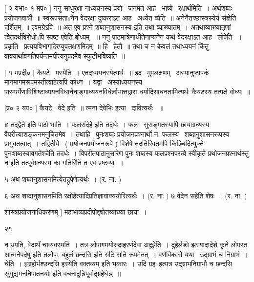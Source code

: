 \documentclass[11pt, openany]{book}
\begin{document}
 [ २ यभा० १ मप० ] ननु साधुरक्षा नाध्ययनस्य प्रयो \textendash\ जनमत
आह \textendash\ भाष्ये \textendash\ रक्षार्थमिति~। अर्थशब्दः प्रयोजनवाची~॥ स्वरूपसताsनेन
वेदरक्षा दुष्कराऽत आह \textendash\ अध्येत व्येति~॥ अनेनैतच्छास्त्रस्येयं संज्ञेति
दर्शितम्~॥ एवमग्रेऽपि~॥ अत एव प्रश्ने {\qt शब्दानुशासनस्य} इति तथा
व्याख्यातम्~। अतथाव्याख्यातृणां त्वेतदर्थविरोधोsपि स्पष्ट एवेति बोध्यम्
~॥ ननु पाठमात्रेणाधीतेनाप्यनेन कथं वेदरक्षाऽत आह \textendash\ लोपेति ~॥प्रकृति \textendash\ 
प्रत्ययविभागादेरप्युपलक्षणमिदम्~॥ हि \textendash\ हेतौ~॥ तथा च न केवलं तथाध्ययनं
किंतु वाक्यार्थावगतिपर्यन्तमपीत्यनुपदमेव स्फुटीभविष्यति~॥ 

 [ १ मप्रदी० ] कैयटे \textendash\ मस्येति~। एतदध्ययनस्येत्यर्थः~॥ इद \textendash\ 
मुपलक्षणम् \textendash\ अस्यानुष्ठापकं मानमागमरूपमस्तीत्वाहेत्यपि कोध्न~। 
यद्वा \textendash\ अस्याध्ययनस्य
पारम्पर्येणाविशिष्टाध्ययनविधानेनाङ्गाध्ययनविधेर्लाभात्तद्वारा
धर्मादिसाधनतामित्यर्थः कैयटस्य तत्पक्षे वोध्यः~॥ 

 [प्र० २ यप० ] कैयटे \textendash\ वेदे इति~॥ त्मना देवेभिः इत्या \textendash\ दावित्यर्थः
~॥ 



४ तद्द्वैते इति पाठो भाति~। फलसंदेहे इति तदर्धः~। फल \textendash\ सुसङ्गतस्यापि
छायाग्रन्थस्य वैपरीत्याशङ्कनमनुचितमेव~। तथाहि \textendash\ पुनःशब्दः
प्रयोजनप्रश्नार्थो न, फलस्य \textendash\ शब्दानुशासनरूपस्य प्रागुक्तत्वात्~। 
तद्वितीये \textendash\ ( प्रयोजनप्रयोजनरूपे ) विशेषे तदतिरिक्तमपि किञ्चिदित्युक्ते
पुनःशब्दस्यावगतेश्चेति तदर्धः~। विपरीतपाठानुसारेण पुनः शब्दस्य
फलप्रश्नपरत्वे स्वीकृते {\qt प्रथोजनप्रश्नार्थस्तु} न इति तत्पूर्वग्रन्थस्य
का गतिरिति त एव प्रष्टव्याः~। 

५ अथ शब्दानुशासनमित्येतद्रूपेणेत्यर्थः~। (र. ना. ) 

६ अथ शब्दानुशासनमिति रक्षोहेत्यादिप्रतिज्ञावाक्ययोरित्यर्थः~। (र. नाः )
७ वेदेन सहेति शेषः~। (र. ना. ) 

शास्त्रप्रयोजनाधिकरणम् ] महाभाष्यप्रदीपोद्द्योतव्याख्या छाया~। 

 २१ 

 



न भ्रमति, वेदार्थं चाव्यवस्यति~। तत्र लोपागमयोरुदाहरणंदेवा
अदुह्रेति~। दुहेर्लङो झस्यादादेशे कृते लोपस्त {\qt आत्मनेपदेषु} इति तलोपः,
{\qt बहुलं छन्दसि} इति रुटि सति रूपमेतत्~। वर्णविकारो यथा \textendash\ उद्ग्राभं च
निग्राभं~। चेति~। {\qt हृग्रहोर्भश्छन्दसि हस्येति वक्तव्यम्} इति
भकारः~। {\qt उदि ग्रहः} इत्यत्र उद्ग्राभनिग्राभौ च छन्दसि
स्रुगुद्यमननिपातनयोः इति वचनादुन्निपूर्वाद्ग्रहेर्घञ्~॥ 
\end{document}
